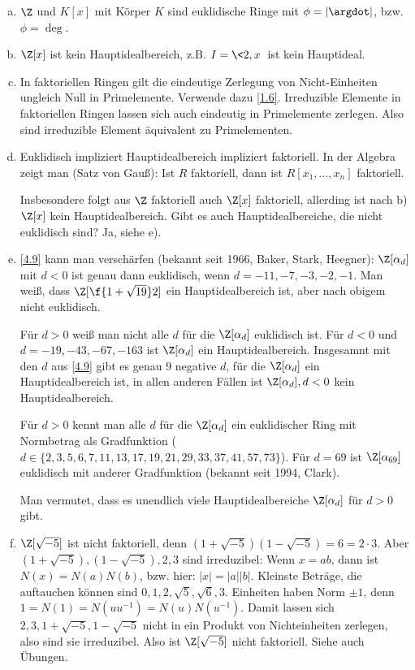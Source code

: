 \begin{nt} \label{4.11}
	\begin{enumerate}[a)]
		\item
			$\Z$ und $K[x]$ mit Körper $K$ sind euklidische Ringe mit $\phi = |\argdot|$, bzw. $\phi = \deg$.
		\item
			$\Z[x]$ ist kein Hauptidealbereich, z.B. $I = \<2, x\>$ ist kein Hauptideal.
		\item
			In faktoriellen Ringen gilt die eindeutige Zerlegung von Nicht-Einheiten ungleich Null in Primelemente.
			Verwende dazu \ref{1.6}.
			Irreduzible Elemente in faktoriellen Ringen lassen sich auch eindeutig in Primelemente zerlegen.
			Also sind irreduzible Element äquivalent zu Primelementen.
		\item
			Euklidisch impliziert Hauptidealbereich impliziert faktoriell.
			In der Algebra zeigt man (Satz von Gauß):
			Ist $R$ faktoriell, dann ist $R[x_1, \dotsc, x_n]$ faktoriell.

			Insbesondere folgt aus $\Z$ faktoriell auch $\Z[x]$ faktoriell, allerding ist nach b) $\Z[x]$ kein Hauptidealbereich.
			Gibt es auch Hauptidealbereiche, die nicht euklidisch sind? Ja, siehe e).
		\item
			\ref{4.9} kann man verschärfen (bekannt seit 1966, Baker, Stark, Heegner):
			$\Z[\alpha_d]$ mit $d < 0$ ist genau dann euklidisch, wenn $d = -11, -7, -3, -2, -1$.
			Man weiß, dass $\Z[\f{1 + \sqrt{19}}2]$ ein Hauptidealbereich ist, aber nach obigem nicht euklidisch.

			Für $d > 0$ weiß man nicht alle $d$ für die $\Z[\alpha_d]$ euklidisch ist.
			Für $d < 0$ und $d = -19, -43, -67, -163$ ist $\Z[\alpha_d]$ ein Hauptidealbereich.
			Insgesamnt mit den $d$ aus \ref{4.9} gibt es genau 9 negative $d$, für die $\Z[\alpha_d]$ ein Hauptidealbereich ist, in allen anderen Fällen ist $\Z[\alpha_d], d < 0$ kein Hauptidealbereich.

			Für $d > 0$ kennt man alle $d$ für die $\Z[\alpha_d]$ ein euklidischer Ring mit Normbetrag als Gradfunktion ($d \in \{2, 3, 5, 6, 7, 11, 13, 17, 19, 21, 29, 33, 37, 41, 57, 73\}$).
			Für $d = 69$ ist $\Z[\alpha_{69}]$ euklidisch mit anderer Gradfunktion (bekannt seit 1994, Clark).

			Man vermutet, dass es unendlich viele Hauptidealbereiche $\Z[\alpha_d]$ für $d > 0$ gibt.
		\item
			$\Z[\sqrt{-5}]$ ist nicht faktoriell, denn $(1 + \sqrt{-5})(1 - \sqrt{-5}) = 6 = 2 \cdot 3$.
			Aber $(1 + \sqrt{-5}), (1 - \sqrt{-5}), 2, 3$ sind irreduzibel:
			Wenn $x = ab$, dann ist $N(x) = N(a)N(b)$, bzw. hier: $|x| = |a||b|$.
			Kleinste Beträge, die auftauchen können sind $0, 1, 2, \sqrt{5}, \sqrt{6}, 3$.
			Einheiten haben Norm $\pm 1$, denn $1 = N(1) = N(u u^{-1}) = N(u) N(u^{-1})$.
			Damit lassen sich $2, 3, 1 + \sqrt{-5}, 1 - \sqrt{-5}$ nicht in ein Produkt von Nichteinheiten zerlegen, also sind sie irreduzibel.
			Also ist $\Z[\sqrt{-5}]$ nicht faktoriell.
			Siehe auch Übungen.
	\end{enumerate}
\end{nt}

